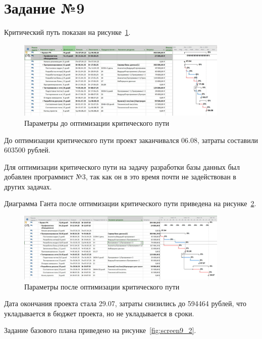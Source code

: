 \section{Задание №9}

Критический путь показан на рисунке~\ref{fig:screen9_0}.

\begin{figure}[H]
	\centering
	\includegraphics[width=0.9\textwidth]{img/task9/screen9_0.jpg}
	\caption{Параметры до оптимизации критического пути}
	\label{fig:screen9_0}
\end{figure}

До оптимизации критического пути проект заканчивался 06.08, затраты составили 603500 рублей.

Для оптимизации критического пути на задачу разработки базы данных был добавлен программист №3, так как он в это время почти не задействован в других задачах.

Диаграмма Ганта после оптимизации критического пути приведена на рисунке~\ref{fig:screen9_1}.

\begin{figure}[H]
	\centering
	\includegraphics[width=0.9\textwidth]{img/task9/screen9_1.jpg}
	\caption{Параметры после оптимизации критического пути}
	\label{fig:screen9_1}
\end{figure}

Дата окончания проекта стала 29.07, затраты снизились до 594464 рублей, что укладывается в бюджет проекта, но не укладывается в сроки.

Задание базового плана приведено на рисунке~\ref{fig:screen9_2}.

